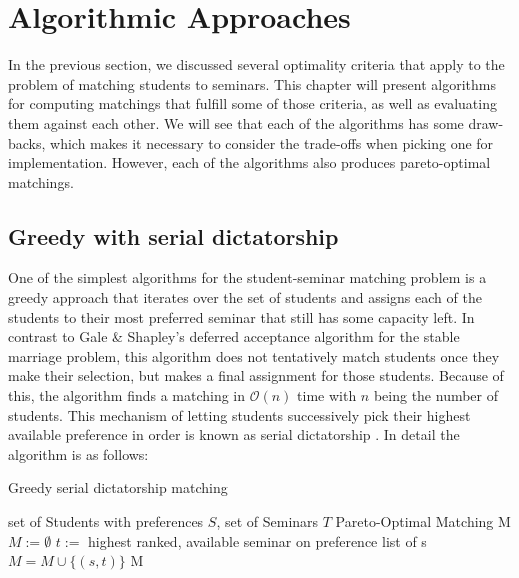 \section{Algorithmic Approaches}\label{chapter:algorithms}
In the previous section, we discussed several optimality criteria that apply to the problem of matching students to seminars. This chapter will present algorithms for computing matchings that fulfill some of those criteria, as well as evaluating them against each other. We will see that each of the algorithms has some draw-backs, which makes it necessary to consider the trade-offs when picking one for implementation. However, each of the algorithms also produces pareto-optimal matchings. 

\subsection{Greedy with serial dictatorship}\label{algo-rsd}
One of the simplest algorithms for the student-seminar matching problem is a greedy approach that iterates over the set of students and assigns each of the students to their most preferred seminar that still has some capacity left. In contrast to Gale \& Shapley's deferred acceptance algorithm for the stable marriage problem, this algorithm does not tentatively match students once they make their selection, but makes a final assignment for those students. Because of this, the algorithm finds a matching in $\mathcal{O}(n)$ time with $n$ being the number of students. This mechanism of letting students successively pick their highest available preference in order is known as serial dictatorship \cite{MANEA2007316}. In detail the algorithm is as follows: 

\begin{algorithm} %
    \caption{Greedy serial dictatorship matching} 
    \label{alg1} %
    \begin{algorithmic} %
        \Require set of Students with preferences $S$, set of Seminars $T$
        \Ensure Pareto-Optimal Matching M
        \State $M := \emptyset$
            \State $t :=$ highest ranked, available seminar on preference list of s
                \State $M = M \cup \{(s, t)\}$
            \EndIf
        \EndFor
        \State\Return M
        \EndFunction
    \end{algorithmic}
\end{algorithm}

